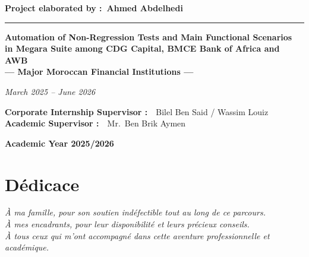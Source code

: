 \documentclass[12pt, a4paper]{report}
\begin{document}
\begin{titlepage}
\begin{center}
  \vspace{0.3cm}
  {\Large\bfseries Project elaborated by :\ Ahmed Abdelhedi}

  \vspace{0.7cm}
  {\color{vermegRed}\rule{0.6\linewidth}{1pt}}

  \vspace{0.5cm}
  {\normalsize\bfseries
    Automation of Non-Regression Tests and Main Functional Scenarios\\[4pt]
    in Megara Suite among CDG Capital, BMCE Bank of Africa and AWB\\[4pt]
    — Major Moroccan Financial Institutions —}

  \vspace{0.4cm}
  {\normalsize\itshape March 2025 – June 2026}

  \vspace{0.7cm}
\end{center}

\begin{flushleft}
  {\normalsize\bfseries Corporate Internship Supervisor :}\ \ Bilel Ben Said / Wassim Louiz\\[6pt]
  {\normalsize\bfseries Academic Supervisor :}\ \ Mr.\ Ben Brik Aymen
\end{flushleft}

\vfill
\begin{center}
  \textbf{Academic Year 2025/2026}
\end{center}

\restoregeometry
\end{titlepage}

\chapter*{Dédicace}
\thispagestyle{empty}
\begin{center}
\vspace*{2cm}
\itshape
À ma famille, pour son soutien indéfectible tout au long de ce parcours.\\[1em]
À mes encadrants, pour leur disponibilité et leurs précieux conseils.\\[1em]
À tous ceux qui m'ont accompagné dans cette aventure professionnelle et académique.
\end{center}
\newpage

\end{document}
